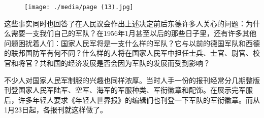\begin{figure}
\texttt{[image: ./media/page (13).jpg]}
\end{figure}

这些事实同时也回答了在人民议会作出上述决定前后东德许多人关心的问题：为什么需要一支我们自己的军队？在1956年1月甚至以后的那些日子里，还有许多其他问题困扰着人们：国家人民军将是一支什么样的军队？它与以前的德国军队和西德的联邦国防军有何不同？什么样的人将在国家人民军中担任士兵、士官、尉官、校官和将官？共和国的经济发展是否会因为军队的发展而受到影响？

不少人对国家人民军制服的兴趣也同样浓厚。当时人手一份的报刊经常分几期整版刊登国家人民军陆军、空军、海军的军服种类、军衔徽章和配饰。在展示完军服后，许多年轻人要求《年轻人世界报》的编辑们也刊登一下军队的军衔徽章。而从1月23日起，各报刊就这样做了。








